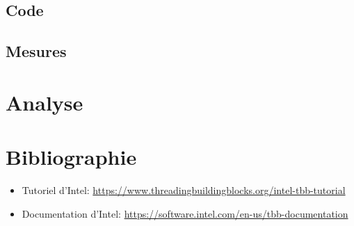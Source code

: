 \documentclass[10pt,a4paper]{article}
\begin{document}
\subsection{Code}

\subsection{Mesures}
 
\newpage

\section{Analyse}

\newpage

\section{Bibliographie}
\begin{itemize}
	\item Tutoriel d'Intel: \url{https://www.threadingbuildingblocks.org/intel-tbb-tutorial}
	\item Documentation d'Intel: \url{https://software.intel.com/en-us/tbb-documentation}
\end{itemize}
\end{document}
